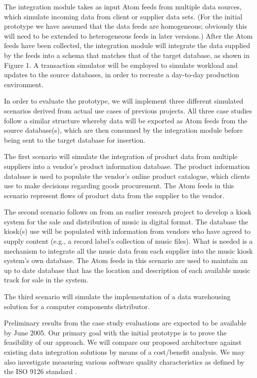 \documentclass{CRPITStyle}
\begin{document}
The integration module takes as input Atom feeds from multiple data
sources, which simulate incoming data from client or supplier data sets.
(For the initial prototype we have assumed that the data feeds are
homogeneous; obviously this will need to be extended to heterogeneous
feeds in later versions.) After the Atom feeds have been collected, the
integration module will integrate the data supplied by the feeds into a
schema that matches that of the target database, as shown in Figure 1. A
transaction simulator will be employed to simulate workload and updates
to the source databases, in order to recreate a day-to-day production
environment.

In order to evaluate the prototype, we will implement three different
simulated scenarios derived from actual use cases of previous projects.
All three case studies follow a similar structure whereby data will be
exported as Atom feeds from the source database(s), which are then
consumed by the integration module before being sent to the target
database for insertion.

The first scenario will simulate the integration of product data from
multiple suppliers into a vendor's product information database. The
product information database is used to populate the vendor's online
product catalogue, which clients use to make decisions regarding goods
procurement. The Atom feeds in this scenario represent flows of product
data from the supplier to the vendor.

The second scenario follows on from an earlier research project to
develop a kiosk system for the sale and distribution of music in digital
format. The database the kiosk(s) use will be populated with information
from vendors who have agreed to supply content (e.g., a record label's
collection of music files). What is needed is a mechanism to integrate
all the music data from each supplier into the music kiosk system's own
database. The Atom feeds in this scenario are used to maintain an up to
date database that has the location and description of each available
music track for sale in the system.

The third scenario will simulate the implementation of a data
warehousing solution for a computer components distributor.

Preliminary results from the case study evaluations are expected to be
available by June 2005. Our primary goal with the initial prototype is
to prove the feasibility of our approach. We will compare our proposed
architecture against existing data integration solutions by means of a
cost/benefit analysis. We may also investigate measuring various
software quality characteristics as defined by the ISO 9126 standard
\cite{ISO-2001-9126-1}.
\end{document}
